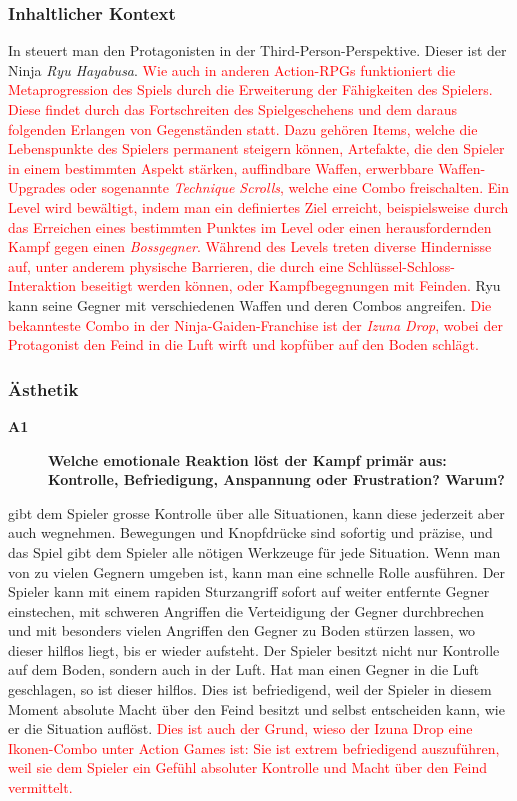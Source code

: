 \documentclass[../Main.tex]{subfiles}
\begin{document}
\subsubsection{Inhaltlicher Kontext}

In  steuert man den Protagonisten in der Third-Person-Perspektive. Dieser ist der Ninja \textit{Ryu Hayabusa}. \textcolor{red}{Wie auch in anderen Action-RPGs funktioniert die Metaprogression des Spiels durch die Erweiterung der Fähigkeiten des Spielers. Diese findet durch das Fortschreiten des Spielgeschehens und dem daraus folgenden Erlangen von Gegenständen statt. Dazu gehören Items, welche die Lebenspunkte des Spielers permanent steigern können, Artefakte, die den Spieler in einem bestimmten Aspekt stärken, auffindbare Waffen, erwerbbare Waffen-Upgrades oder sogenannte \textit{Technique Scrolls}, welche eine Combo freischalten. Ein Level wird bewältigt, indem man ein definiertes Ziel erreicht, beispielsweise durch das Erreichen eines bestimmten Punktes im Level oder einen herausfordernden Kampf gegen einen \textit{Bossgegner}. Während des Levels treten diverse Hindernisse auf, unter anderem physische Barrieren, die durch eine Schlüssel-Schloss-Interaktion beseitigt werden können, oder Kampfbegegnungen mit Feinden.} Ryu kann seine Gegner mit verschiedenen Waffen und deren Combos angreifen. \textcolor{red}{Die bekannteste Combo in der Ninja-Gaiden-Franchise ist der \textit{Izuna Drop}, wobei der Protagonist den Feind in die Luft wirft und kopfüber auf den Boden schlägt.}

\subsubsection{Ästhetik}

\begin{description}
    \item[\textbf{A1}] \textbf{Welche emotionale Reaktion löst der Kampf primär aus: Kontrolle, Befriedigung, Anspannung oder Frustration? Warum?}
\end{description}

 gibt dem Spieler grosse Kontrolle über alle Situationen, kann diese jederzeit aber auch wegnehmen. Bewegungen und Knopfdrücke sind sofortig und präzise, und das Spiel gibt dem Spieler alle nötigen Werkzeuge für jede Situation. Wenn man von zu vielen Gegnern umgeben ist, kann man eine schnelle Rolle ausführen. Der Spieler kann mit einem rapiden Sturzangriff sofort auf weiter entfernte Gegner einstechen, mit schweren Angriffen die Verteidigung der Gegner durchbrechen und mit besonders vielen Angriffen den Gegner zu Boden stürzen lassen, wo dieser hilflos liegt, bis er wieder aufsteht. Der Spieler besitzt nicht nur Kontrolle auf dem Boden, sondern auch in der Luft. Hat man einen Gegner in die Luft geschlagen, so ist dieser hilflos. Dies ist befriedigend, weil der Spieler in diesem Moment absolute Macht über den Feind besitzt und selbst entscheiden kann, wie er die Situation auflöst. \textcolor{red}{Dies ist auch der Grund, wieso der Izuna Drop eine Ikonen-Combo unter Action Games ist: Sie ist extrem befriedigend auszuführen, weil sie dem Spieler ein Gefühl absoluter Kontrolle und Macht über den Feind vermittelt.}
\end{document}
